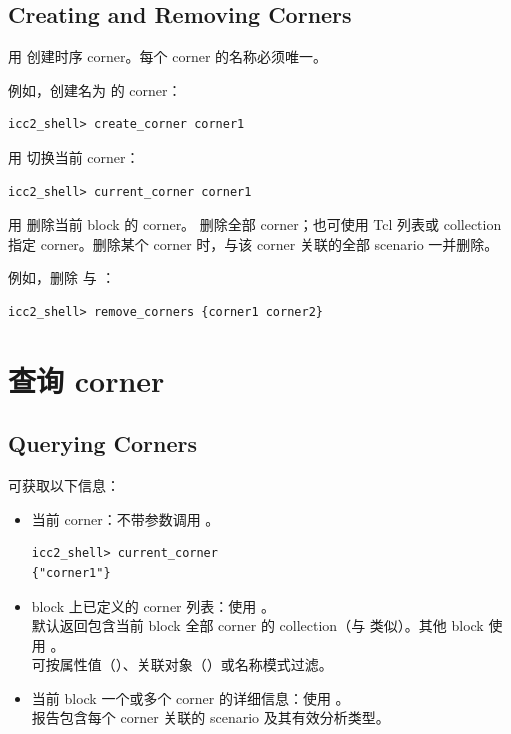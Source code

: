 \subsection*{Creating and Removing Corners}

用  创建时序 corner。每个 corner 的名称必须唯一。

例如，创建名为  的 corner：
\begin{lstlisting}
icc2_shell> create_corner corner1
\end{lstlisting}

用  切换当前 corner：
\begin{lstlisting}
icc2_shell> current_corner corner1
\end{lstlisting}

用  删除当前 block 的 corner。 删除全部 corner；也可使用 Tcl 列表或 collection 指定 corner。删除某个 corner 时，与该 corner 关联的全部 scenario 一并删除。

例如，删除  与 ：
\begin{lstlisting}
icc2_shell> remove_corners {corner1 corner2}
\end{lstlisting}

\section{查询 corner}
\subsection*{Querying Corners}

可获取以下信息：
\begin{itemize}
  \item 当前 corner：不带参数调用 。
\begin{lstlisting}
icc2_shell> current_corner
{"corner1"}
\end{lstlisting}
  \item block 上已定义的 corner 列表：使用 。\\
        默认返回包含当前 block 全部 corner 的 collection（与  类似）。其他 block 使用 。\\
        可按属性值（）、关联对象（）或名称模式过滤。
  \item 当前 block 一个或多个 corner 的详细信息：使用 。\\
        报告包含每个 corner 关联的 scenario 及其有效分析类型。
\end{itemize}

